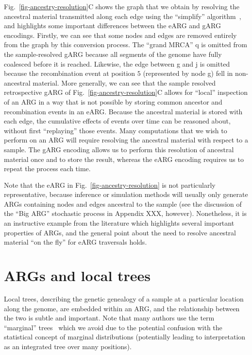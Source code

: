 \documentclass{article}
\newcommand{\noderef}[1]{\textsf{#1}}
\begin{document}
Fig.~\ref{fig-ancestry-resolution}C shows the graph that we obtain
by resolving the ancestral material transmitted along each edge
using the ``simplify'' algorithm~\citep{kelleher2018efficient},
and highlights some important
differences between the eARG and gARG encodings.
Firstly, we can see that some nodes and edges are removed entirely
from the graph by this conversion process.
The ``grand MRCA'' \noderef{q} is omitted from the
sample-resolved gARG because all segments of the genome have
fully coalesced before it is reached. Likewise, the edge
between \noderef{g} and \noderef{j} is omitted because the recombination
event at position $5$ (represented by node \noderef{g})
fell in non-ancestral material.
More generally, we can see that the sample resolved
retrospective gARG of Fig.~\ref{fig-ancestry-resolution}C
allows for ``local'' inspection
of an ARG in a way that is not possible by storing
common ancestor and recombination events in an eARG. Because
the ancestral material is stored with each edge, the
cumulative effects of events over time can be reasoned
about, without first ``replaying'' those events. Many computations
that we wish to perform on an ARG will require resolving
the ancestral material with respect to a sample.
The gARG encoding
allows us to perform this resolution of ancestral material once
and to store the result,
whereas the eARG encoding requires us to repeat the process
each time.

Note that the \citet{wiuf1999recombination} eARG
in Fig.~\ref{fig-ancestry-resolution} is not particularly
representative, because inference or simulation methods will usually
only generate ARGs containing nodes and edges ancestral to the sample
(see the discussion of the ``Big ARG'' stochastic process in Appendix XXX, however).
Nonetheless, it is an instructive example from the literature which highlights several
important properties of ARGs, and the general point about
the need to resolve ancestral material ``on the fly'' for eARG traversals
holds.

\section*{ARGs and local trees}
Local trees, describing the genetic genealogy of a sample
at a particular location along the genome, are
embedded within an ARG, and the relationship
between the two is subtle and important.
Note that many authors use the term ``marginal''
trees~\citep[e.g.][]{griffiths1996ancestral,minichiello2006mapping,kelleher2016efficient}
which we avoid due to the potential confusion with the
statistical concept of marginal distributions
(potentially leading to interpretation as an integrated tree over many positions).
\end{document}
